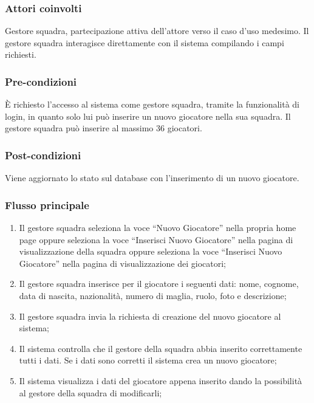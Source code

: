 \subsubsection*{Attori coinvolti}
Gestore squadra, partecipazione attiva dell'attore verso il caso d'uso medesimo.
Il gestore squadra interagisce direttamente con il sistema compilando i campi richiesti.

\subsubsection*{Pre-condizioni}
È richiesto l'accesso al sistema come gestore squadra, tramite la funzionalità di login, in quanto solo lui può inserire un nuovo giocatore nella sua squadra. Il gestore squadra può inserire al massimo 36 giocatori.

\subsubsection*{Post-condizioni}
Viene aggiornato lo stato sul database con l'inserimento di un nuovo giocatore.

\subsubsection*{Flusso principale}

\begin{enumerate}
	
	\item
	Il gestore squadra seleziona la voce ``Nuovo Giocatore'' nella propria home page oppure seleziona la voce ``Inserisci Nuovo Giocatore'' nella pagina di visualizzazione della squadra oppure seleziona la voce ``Inserisci Nuovo Giocatore'' nella pagina di visualizzazione dei giocatori;
	
	\item
	Il gestore squadra inserisce per il giocatore i seguenti dati: nome, cognome, data di nascita, nazionalità, numero di maglia, ruolo, foto e descrizione;
	
	\item
	Il gestore squadra invia la richiesta di creazione del nuovo giocatore al sistema;
	
	\item
	Il sistema controlla che il gestore della squadra abbia inserito correttamente tutti i dati. Se i dati sono corretti il sistema crea un nuovo giocatore;
	
	\item
	Il sistema visualizza i dati del giocatore appena inserito dando la possibilità al gestore della squadra di modificarli;
	
\end{enumerate}

